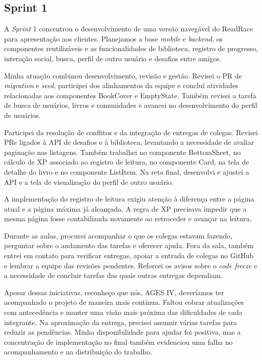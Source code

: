 \clearpage
\subsection{Sprint 1}

A \textit{Sprint} 1 concentrou o desenvolvimento de uma versão navegável do ReadRace para apresentação aos clientes. Planejamos a base \textit{mobile} e \textit{backend}, os componentes reutilizáveis e as funcionalidades de biblioteca, registro de progresso, interação social, busca, perfil de outro usuário e desafios entre amigos.

Minha atuação combinou desenvolvimento, revisão e gestão. Revisei o \ac{PR} de \textit{migration} e \textit{seed}, participei dos alinhamentos da equipe e concluí atividades relacionadas aos componentes BookCover e EmptyState. Também revisei a tarefa de busca de usuários, livros e comunidades e avancei no desenvolvimento do perfil de usuários.

Participei da resolução de conflitos e da integração de entregas de colegas. Revisei \ac{PRs} ligados à \ac{API} de desafios e à biblioteca, levantando a necessidade de avaliar paginação nas listagens. Também trabalhei no componente BottomSheet, no cálculo de \ac{XP} associado ao registro de leitura, no componente Card, na tela de detalhe do livro e no componente ListItem. Na reta final, desenvolvi e ajustei a \ac{API} e a tela de visualização do perfil de outro usuário.

A implementação do registro de leitura exigiu atenção à diferença entre a página atual e a página máxima já alcançada. A regra de \ac{XP} precisava impedir que a mesma página fosse contabilizada novamente ao retroceder e avançar na leitura.

Durante as aulas, procurei acompanhar o que os colegas estavam fazendo, perguntar sobre o andamento das tarefas e oferecer ajuda. Fora da sala, também entrei em contato para verificar entregas, apoiar a entrada de colegas no GitHub e lembrar a equipe das revisões pendentes. Reforcei os avisos sobre o \textit{code freeze} e a necessidade de concluir tarefas das quais outras entregas dependiam.

Apesar dessas iniciativas, reconheço que nós, \ac{AGES} IV, deveríamos ter acompanhado o projeto de maneira mais contínua. Faltou cobrar atualizações com antecedência e manter uma visão mais próxima das dificuldades de cada integrante. Na aproximação da entrega, precisei assumir várias tarefas para reduzir as pendências. Minha disponibilidade para ajudar foi positiva, mas a concentração de implementação no final também evidenciou uma falha no acompanhamento e na distribuição do trabalho.

